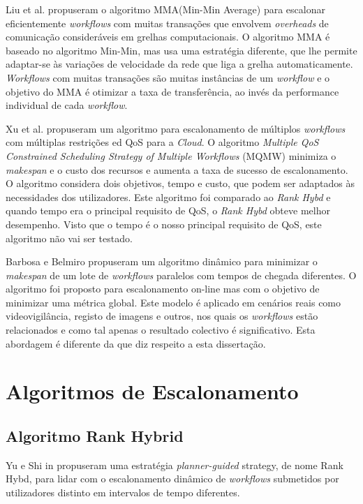Liu et al. \cite{Liu2009} propuseram o algoritmo MMA(Min-Min Average) para escalonar eficientemente \textit{workflows} com muitas transações que envolvem \textit{overheads} de comunicação consideráveis em grelhas computacionais. 
O algoritmo MMA é baseado no algoritmo Min-Min, mas usa uma estratégia diferente, que lhe permite adaptar-se às variações de velocidade da rede que liga a grelha automaticamente. \textit{Workflows} com muitas transações são muitas instâncias de um \textit{workflow} e o objetivo do MMA é otimizar a taxa de transferência, ao invés da performance individual de cada \textit{workflow}. 

Xu et al. \cite{Xu2009} propuseram um algoritmo para escalonamento de múltiplos \textit{workflows} com múltiplas restrições ed QoS para a \textit{Cloud}. O algoritmo \textit{Multiple QoS Constrained Scheduling Strategy of Multiple Workflows} (MQMW) minimiza o \textit{makespan} e o custo dos recursos e aumenta a taxa de sucesso de escalonamento. O algoritmo considera dois objetivos, tempo e custo, que podem ser adaptados às necessidades dos utilizadores. Este algoritmo foi comparado ao \textit{Rank Hybd} e quando tempo era o principal requisito de QoS, o \textit{Rank Hybd} obteve melhor desempenho. Visto que o tempo é o nosso principal requisito de QoS, este algoritmo não vai ser testado. 

Barbosa e Belmiro \cite{Barbosa2011} propuseram um algoritmo dinâmico para minimizar o \textit{makespan} de um lote de \textit{workflows} paralelos com tempos de chegada diferentes. O algoritmo foi proposto para escalonamento on-line mas com o objetivo de minimizar uma métrica global. Este modelo é aplicado em cenários reais como videovigilância, registo de imagens e outros, nos quais os \textit{workflows} estão relacionados e como tal apenas o resultado colectivo é significativo. Esta abordagem é diferente da que diz respeito a esta dissertação.


\section{Algoritmos de Escalonamento} \label{sec:schalg}

\subsection{Algoritmo Rank Hybrid}
Yu e Shi in \cite{Yu2008} propuseram uma estratégia \textit{planner-guided} strategy, de nome Rank Hybd, para lidar com o escalonamento dinâmico de \textit{workflows} submetidos por utilizadores distinto em intervalos de tempo diferentes.

